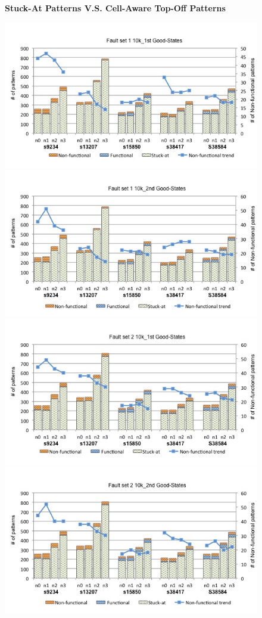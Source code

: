 \documentclass[12pt]{article}
\begin{document}
\begin{figure}[h!]
\begin{center}
\textbf{Stuck-At Patterns V.S. Cell-Aware Top-Off Patterns}\par\medskip
\end{center}
\begin{@twocolumntrue}
\includegraphics[scale=0.25,width=0.5\linewidth]{../top_off_set1_10k_1st.jpg}
\includegraphics[scale=0.25,width=0.5\linewidth]{../top_off_set1_10k_2nd.jpg}\\ 
\includegraphics[scale=0.25,width=0.5\linewidth]{../top_off_set2_10k_1st.jpg}
\includegraphics[scale=0.25,width=0.5\linewidth]{../top_off_set2_10k_2nd.jpg}
\end{@twocolumntrue}
\end{figure}
\end{document}

